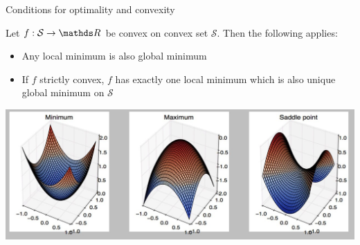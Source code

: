 \begin{vbframe}{Conditions for optimality and convexity}

Let $f:\mathcal{S} \to \R$ be convex on convex set $\mathcal{S}$. Then the following applies:

\begin{itemize}
\item Any local minimum is also global minimum 
\item If $f$ strictly convex, $f$ has exactly one local minimum which is also unique global minimum on $\mathcal{S}$
\end{itemize}

\begin{center}
\includegraphics[scale= 0.5]{figure_man/convex.jpg}
\end{center}


\end{vbframe}


  \endlecture
  
  
  
  